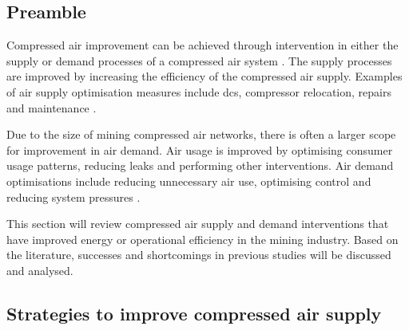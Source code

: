 	\subsection{Preamble}
		Compressed air improvement can be achieved through intervention in either the supply or demand processes of a compressed air system \cite{Kriel2014Masters}. The supply processes are improved by increasing the efficiency of the compressed air supply. Examples of air supply optimisation measures include \gls{dcs}, compressor relocation, repairs and maintenance \cite{Snyman2011Masters}.
		\par
		Due to the size of mining compressed air networks, there is often a larger scope for improvement in air demand. Air usage is improved by optimising consumer usage patterns, reducing leaks and performing other interventions. Air demand optimisations include reducing unnecessary air use, optimising control and reducing system pressures \cite{kleingeld2010high}.
		\par
	 	 This section will review compressed air supply and demand interventions that have improved energy or operational efficiency in the mining industry. Based on the literature, successes and shortcomings in previous studies will be discussed and analysed.
	 	
	\subsection{Strategies to improve compressed air supply}

